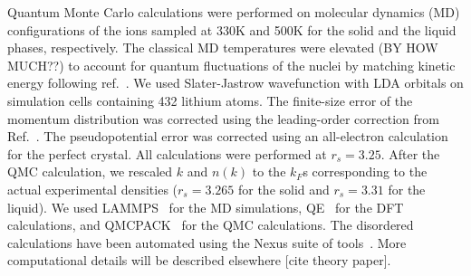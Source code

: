 \documentclass[twocolumn,showpacs,showkeys,fleqn,prl,superscriptaddress]{revtex4}%
\begin{document}
\vspace{10mm}

Quantum Monte Carlo calculations were performed on molecular dynamics (MD) configurations of the ions sampled at 330K and 500K for the solid and the liquid phases, respectively. The classical MD temperatures were elevated (BY HOW MUCH??) to account for quantum fluctuations of the nuclei by matching kinetic energy following ref.~\cite{filippi98}. We used Slater-Jastrow wavefunction with LDA orbitals on simulation cells containing 432 lithium atoms. The finite-size error of the momentum distribution was corrected using the leading-order correction from Ref.~\cite{holz09}. The pseudopotential error was corrected using an all-electron calculation for the perfect crystal. All calculations were performed at $r_s=3.25$. After the QMC calculation, we rescaled $k$ and $n(k)$ to the $k_F$s corresponding to the actual experimental densities ($r_s=3.265$ for the solid and $r_s=3.31$ for the liquid). We used LAMMPS~\cite{Plimpton1993} for the MD simulations, QE~\cite{Giannozzi2009,Enkovaara2017} for the DFT calculations, and QMCPACK~\cite{Kim2018} for the QMC calculations. The disordered calculations have been automated using the Nexus suite of tools~\cite{Krogel2016}.
More computational details will be described elsewhere [cite theory paper].

\end{document}
